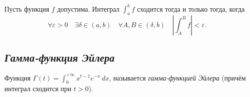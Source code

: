 \begin{theorem}
	Пусть функция \(f\) допустима. Интеграл \(\int_a^b f\) сходится тогда и только тогда, когда \[
		\forall \varepsilon > 0 \quad \exists \delta \in (a, b) \quad \forall A, B \in (\delta, b) \quad \left|\int_A^B f \right| < \varepsilon.
	\]
\end{theorem}

\subsection{\itshape Гамма-функция Эйлера}

\begin{definition}
	Функция \(\displaystyle \Gamma(t) = \int_{0}^{+\infty} x^{t - 1} e^{-x} \, dx\), называется \textit{гамма-функцией Эйлера} (причём интеграл сходится при \(t > 0\)).
\end{definition}